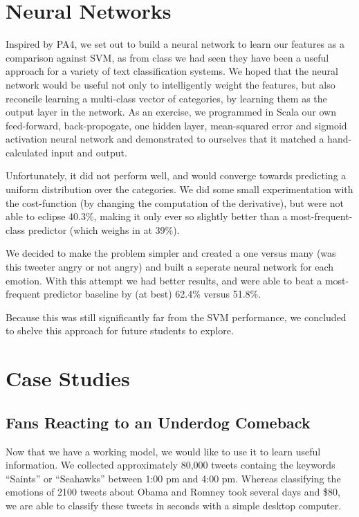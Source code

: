 \documentclass[11pt]{article}
\begin{document}
\section{Neural Networks}

Inspired by PA4, we set out to build a neural network to learn our features as a comparison against SVM, as from class we had seen they have been a useful approach for a variety of text classification systems. We hoped that the neural network would be useful not only to intelligently weight the features, but also reconcile learning a multi-class vector of categories, by learning them as the output layer in the network. As an exercise, we programmed in Scala our own feed-forward, back-propogate, one hidden layer, mean-squared error and sigmoid activation neural network and demonstrated to ourselves that it matched a hand-calculated input and output.

Unfortunately, it did not perform well, and would converge towards predicting a uniform distribution over the categories. We did some small experimentation with the cost-function (by changing the computation of the derivative), but were not able to eclipse 40.3\%, making it only ever so slightly better than a most-frequent-class predictor (which weighs in at 39\%).

We decided to make the problem simpler and created a one versus many (was this tweeter angry or not angry) and built a seperate neural network for each emotion. With this attempt we had better results, and were able to beat a most-frequent predictor baseline by (at best) 62.4\% versus 51.8\%.

Because this was still significantly far from the SVM performance, we concluded to shelve this approach for future students to explore.

\section{Case Studies}

\subsection{Fans Reacting to an Underdog Comeback}

Now that we have a working model, we would like to use it to learn useful information. We collected approximately 80,000 tweets containg the keywords ``Saints'' or ``Seahawks'' between 1:00 pm and 4:00 pm. Whereas classifying the emotions of 2100 tweets about Obama and Romney took several days and \$80, we are able to classify these tweets in seconds with a simple desktop computer.
\end{document}
